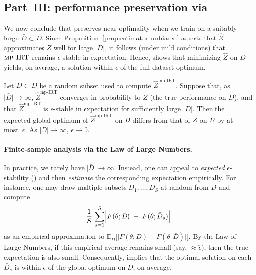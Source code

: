 \subsection{Part~III: performance preservation via \mpirt{}}
\label{subsec:mp-irt-eps-stability-analysis}
%
We now conclude that \mpirt{} preserves near-optimality when we train on 
a suitably large \(\bar{D}\subset D\).  Since 
Proposition~\ref{prop:estimator-unbiased} asserts that \(\hat{Z}\) approximates 
\(Z\) well for large \(\lvert \bar{D}\rvert\), it follows (under mild conditions) 
that \(\mpirt{}\) remains \(\epsilon\)-stable in expectation.  Hence, 
 shows that minimizing \(\hat{Z}\) on 
\(\bar{D}\) yields, on average, a solution within \(\epsilon\) of the 
full-dataset optimum.

\begin{theorem}
\label{thm:mpirt-asymptotic-eps-preserve}
Let \(\bar{D}\subset D\) be a random subset used to compute 
\(\hat{Z}^{\mathrm{mp\text{-}IRT}}\).  Suppose that, as \(\lvert \bar{D}\rvert\to\infty\), 
\(\hat{Z}^{\mathrm{mp\text{-}IRT}}\) converges in probability to \(Z\) (the true 
performance on \(D\)), and that \(\hat{Z}^{\mathrm{mp\text{-}IRT}}\) is 
\(\epsilon\)-stable in expectation for sufficiently large \(\lvert \bar{D}\rvert\).  
Then the expected global optimum of \(\hat{Z}^{\mathrm{mp\text{-}IRT}}\) on \(\bar{D}\) 
differs from that of \(Z\) on \(D\) by at most~\(\epsilon\).  As 
\(\lvert \bar{D}\rvert\to \infty\), \(\epsilon\to 0\).
\end{theorem}

\paragraph{Finite-sample analysis via the Law of Large Numbers.}
In practice, we rarely have \(\lvert \bar{D}\rvert\to\infty\).  Instead, one can 
appeal to \emph{expected} \(\epsilon\)-stability 
() and then \emph{estimate} the corresponding 
expectation empirically.  For instance, one may draw multiple subsets 
\(\bar{D}_1,\ldots,\bar{D}_S\) at random from \(D\) and compute 
\[
  \frac{1}{S}\,\sum_{s=1}^S 
  \Bigl\lvert F(\theta;D) \;-\; F(\theta;\bar{D}_s)\Bigr\rvert
\]
as an empirical approximation to 
\(\mathbb{E}_{\bar{D}}\bigl[\lvert F(\theta;D)-F(\theta;\bar{D})\rvert\bigr]\).
By the Law of Large Numbers, if this empirical average remains small (say, 
\(\approx \tilde{\epsilon}\)), then the true expectation is also small.  
Consequently,  implies that the optimal 
solution on each \(\bar{D}_s\) is within \(\tilde{\epsilon}\) of the global 
optimum on \(D\), on average.

